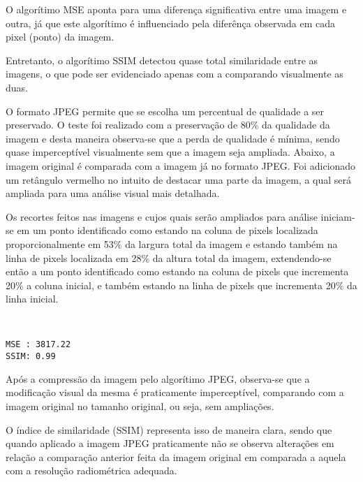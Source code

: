 \documentclass{IEEEtran}
\begin{document}
    O algorítimo MSE aponta para uma diferença significativa entre uma
imagem e outra, já que este algorítimo é influenciado pela diferênça
observada em cada pixel (ponto) da imagem.

Entretanto, o algorítimo SSIM detectou quase total similaridade entre as
imagens, o que pode ser evidenciado apenas com a comparando visualmente
as duas.

O formato JPEG permite que se escolha um percentual de qualidade a ser
preservado. O teste foi realizado com a preservação de 80\% da qualidade
da imagem e desta maneira observa-se que a perda de qualidade é mínima,
sendo quase imperceptível visualmente sem que a imagem seja ampliada.
Abaixo, a imagem original é comparada com a imagem já no formato JPEG.
Foi adicionado um retângulo vermelho no intuito de destacar uma parte da
imagem, a qual será ampliada para uma análise visual mais detalhada.

Os recortes feitos nas imagens e cujos quais serão ampliados para
análise iniciam-se em um ponto identificado como estando na coluna de
pixels localizada proporcionalmente em 53\% da largura total da imagem e
estando também na linha de pixels localizada em 28\% da altura total da
imagem, extendendo-se então a um ponto identificado como estando na
coluna de pixels que incrementa 20\% a coluna inicial, e também estando
na linha de pixels que incrementa 20\% da linha inicial.


    \begin{center}
    \end{center}
    { \hspace*{\fill} \\}
    
    \begin{Verbatim}[commandchars=\\\{\}]
MSE : 3817.22
SSIM: 0.99

    \end{Verbatim}

    Após a compressão da imagem pelo algorítimo JPEG, observa-se que a
modificação visual da mesma é praticamente imperceptível, comparando com
a imagem original no tamanho original, ou seja, sem ampliações.

O índice de similaridade (SSIM) representa isso de maneira clara, sendo
que quando aplicado a imagem JPEG praticamente não se observa alterações
em relação a comparação anterior feita da imagem original em comparada a
aquela com a resolução radiométrica adequada.
\end{document}
